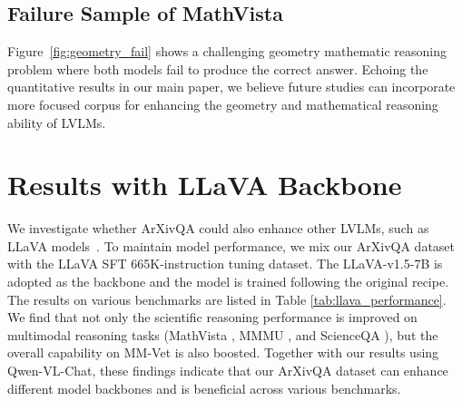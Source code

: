 \subsection{Failure Sample of MathVista}
\label{apx:failure_mathvista}
Figure~\ref{fig:geometry_fail} shows a challenging geometry mathematic reasoning problem where both models fail to produce the correct answer.
Echoing the quantitative results in our main paper, we believe future studies can incorporate more focused corpus for enhancing the geometry and mathematical reasoning ability of LVLMs.

\section{Results with LLaVA Backbone}
\label{apx:llava}


We investigate whether ArXivQA could also enhance other LVLMs, such as LLaVA models~\citep{liu2023llava}. To maintain model performance, we mix our ArXivQA dataset with the LLaVA SFT 665K-instruction tuning dataset. The LLaVA-v1.5-7B is adopted as the backbone and the model is trained following the original recipe. The results on various benchmarks are listed in Table \ref{tab:llava_performance}.
We find that not only the scientific reasoning performance is improved on multimodal reasoning tasks (MathVista \citep{mathvista}, MMMU \citep{mmmu}, and ScienceQA \citep{lu2022scienceqa}), but the overall capability on MM-Vet \citep{yu2024mmvet} is also boosted. Together with our results using Qwen-VL-Chat, these findings indicate that our ArXivQA dataset can enhance different model backbones and is beneficial across various benchmarks.
